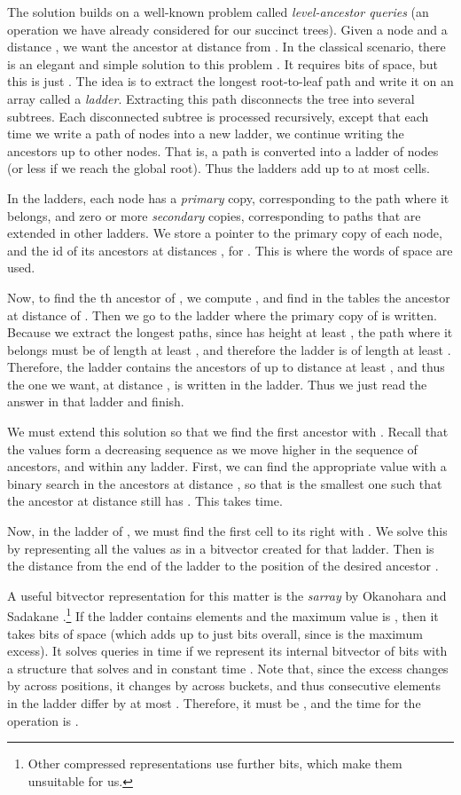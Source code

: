 \documentclass[11pt]{article}
\newcommand{\0}{\mathit{0}}
\newcommand{\1}{\mathit{1}}
\begin{document}
The solution builds on a well-known problem called {\em level-ancestor queries}
(an operation we have already considered for our succinct trees). Given a node
 and a distance , we want the ancestor at distance  from . In the
classical scenario, there is an elegant and simple solution to this problem
\cite{BF04}.
It requires  bits of space, but this is just .
The idea is to extract the longest root-to-leaf path and write it on an array
called a {\em ladder}. Extracting this path disconnects the tree into several 
subtrees. Each disconnected subtree is processed recursively, except that each 
time we write a path  of nodes into a new ladder, we continue 
writing the ancestors up to other  nodes. That is, a path  
is converted into a ladder of  nodes (or less if we reach the global
root). Thus the ladders add up to at most  cells.

In the ladders,
each node has a {\em primary} copy, corresponding to the path  where
it belongs, and zero or more {\em secondary} copies, corresponding to paths
that are extended in other ladders. We store a pointer to the primary copy of
each node, and the id of its ancestors at distances , for .
This is where the  words of space are used.

Now, to find the th ancestor of , we compute ,
and find in the tables the ancestor  at distance  of . Then we go
to the ladder where the primary copy of  is written. Because we
extract the longest paths, since  has height at least , the path
 where it belongs must be of length at least , and therefore
the ladder is of length at least . Therefore, the ladder
contains the ancestors of  up to distance at least , and thus the one
we want, at distance , is written in the ladder. Thus we just read
the answer in that ladder and finish.

We must extend this solution so that we find the first ancestor  with 
. Recall that the values  form a decreasing sequence as we
move higher in the sequence of ancestors, and within any ladder. First, we
can find the appropriate  value with a binary search in the ancestors at
distance , so that  is the smallest one such that the ancestor 
at distance  still has . This takes  time.

Now, in the ladder of , we must find the first cell  to its
right with . We solve this by representing all the  values
as  in a bitvector  created for that ladder. Then 
 is the distance from the end of the ladder to the position of
the desired ancestor .

A useful bitvector representation for this matter is the \emph{sarray} by
Okanohara and Sadakane \cite[Sec.~6]{OS07}.\footnote{Other compressed
representations use  further bits, which make them unsuitable for us.}
If the ladder contains 
elements and the maximum value is , then it takes  bits of space (which adds up to just  bits overall, since
 is the maximum excess). It solves  queries in time
 if we represent its internal bitvector  of 
bits with a structure that solves  and  in constant time
\cite{Cla96}. Note that, since the excess changes by  across positions,
it changes by  across buckets, and thus consecutive elements in the
ladder differ by at most . Therefore, it must be , and
the time for the  operation is .
\end{document}
